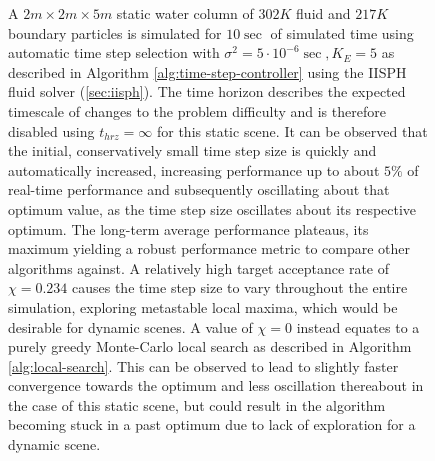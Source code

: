 \documentclass[oneside, a4paper]{book}
\newcommand\br[1]{\left(#1\right)}
\begin{document}
\begin{figure}
      \caption{A $2m\times 2m\times 5m$ static water column of $302K$ fluid and $217K$ boundary particles is simulated for $10\sec$ of simulated time using automatic time step selection with $\sigma^2 = 5\cdot 10^{-6}\sec, K_E=5$ as described in Algorithm \ref{alg:time-step-controller} using the IISPH fluid solver (\autoref{sec:iisph}). The time horizon describes the expected timescale of changes to the problem difficulty and is therefore disabled using $t_{hrz}=\infty$ for this static scene. It can be observed that the initial, conservatively small time step size is quickly and automatically increased, increasing performance up to about $5\%$ of real-time performance and subsequently oscillating about that optimum value, as the time step size oscillates about its respective optimum. The long-term average performance plateaus, its maximum yielding a robust performance metric to compare other algorithms against. A relatively high target acceptance rate of $\chi=0.234$ causes the time step size to vary throughout the entire simulation, exploring metastable local maxima, which would be desirable for dynamic scenes. A value of $\chi=0$ instead equates to a purely greedy Monte-Carlo local search as described in Algorithm \ref{alg:local-search}. This can be observed to lead to slightly faster convergence towards the optimum and less oscillation thereabout in the case of this static scene, but could result in the algorithm becoming stuck in a past optimum due to lack of exploration for a dynamic scene.}
      \label{fig:metropolis-dt-plots}
  \end{figure}
    

    
\end{document}
